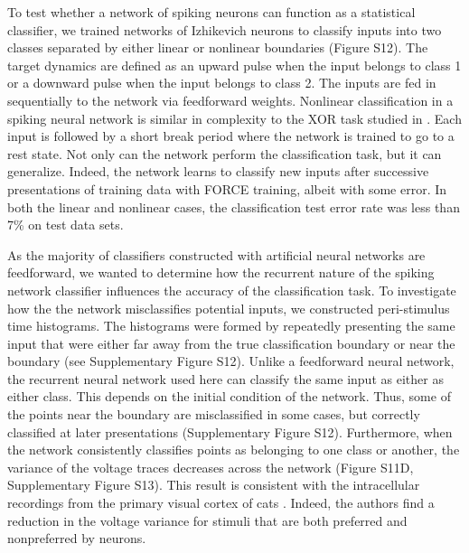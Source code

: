 \documentclass[11pt]{article} %
\begin{document}
To test whether a network of spiking neurons can function as a statistical classifier, we trained networks of Izhikevich neurons to classify inputs into two classes separated by either linear or nonlinear boundaries (Figure S12).  The target dynamics are defined as an upward pulse when the input belongs to class 1 or a downward pulse when the input belongs to class 2.  The inputs are fed in sequentially to the network via feedforward weights.  Nonlinear classification in a spiking neural network is similar in complexity to the XOR task studied in \cite{FORCE2}.   Each input is followed by a short break period where the network is trained to go to a rest state.  Not only can the network perform the classification task, but it can generalize.  Indeed, the network learns to classify new inputs after successive presentations of training data with FORCE training, albeit with some error.  In both the linear and nonlinear cases, the classification test error rate was less than 7\% on test data sets.

As the majority of classifiers constructed with artificial neural networks are feedforward, we wanted to determine how the recurrent nature of the spiking network classifier influences the accuracy of the classification task.  To investigate how the the network misclassifies potential inputs, we constructed peri-stimulus time histograms.  The histograms were formed by repeatedly presenting the same input that were either far away from the true classification boundary or near the boundary (see Supplementary Figure S12).  Unlike a feedforward neural network, the recurrent neural network used here can classify the same input as either as either class.  This depends on the initial condition of the network.  Thus, some of the points near the boundary are misclassified in some cases, but correctly classified at later presentations (Supplementary Figure S12).   Furthermore, when the network consistently classifies points as belonging to one class or another, the variance of the voltage traces decreases across the network (Figure S11D, Supplementary Figure S13).  This result is consistent with the intracellular recordings from the primary visual cortex of cats \cite{ChurchlandVariance,catV1}.  Indeed, the authors find a reduction in the voltage variance for stimuli that are both preferred and nonpreferred by neurons.  
\end{document}
